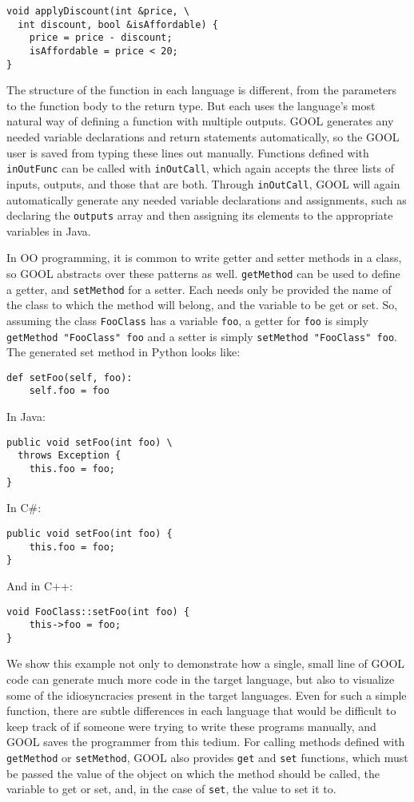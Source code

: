 \documentclass[sigplan,review,anonymous]{acmart}
\begin{document}
\begin{lstlisting}
void applyDiscount(int &price, \
  int discount, bool &isAffordable) {
    price = price - discount;
    isAffordable = price < 20;
}
\end{lstlisting}
The structure of the function in each language is different, from the 
parameters to the function body to the return type. But each uses the 
language's most natural way of defining a function with multiple outputs. GOOL 
generates any needed variable declarations and return statements automatically, 
so the GOOL user is saved from typing these lines out manually. Functions 
defined with \verb|inOutFunc| can be called with \verb|inOutCall|, which again 
accepts the three lists of inputs, outputs, and those that are both. Through 
\verb|inOutCall|, GOOL will again automatically generate any needed variable 
declarations and assignments, such as declaring the \verb|outputs| array and 
then assigning its elements to the appropriate variables in Java.

In OO programming, it is common to write getter and setter methods in a class, 
so GOOL abstracts over these patterns as well. \verb|getMethod| can be used to 
define a getter, and \verb|setMethod| for a setter. Each needs only be provided 
the name of the class to which the method will belong, and the variable to be 
get or set. So, assuming the class \verb|FooClass| has a variable \verb|foo|, a 
getter for \verb|foo| is simply \verb|getMethod "FooClass" foo| and a setter is 
simply \verb|setMethod "FooClass" foo|. The generated set method in Python 
looks like:
\begin{lstlisting}
def setFoo(self, foo):
    self.foo = foo
\end{lstlisting}
In Java:
\begin{lstlisting}
public void setFoo(int foo) \
  throws Exception {
    this.foo = foo;
}
\end{lstlisting}
In C\#:
\begin{lstlisting}
public void setFoo(int foo) {
    this.foo = foo;
}
\end{lstlisting}
And in C++:
\begin{lstlisting}
void FooClass::setFoo(int foo) {
    this->foo = foo;
}
\end{lstlisting}
We show this example not only to demonstrate how a single, small line of GOOL 
code can generate much more code in the target language, but also to visualize 
some of the idiosyncracies present in the target languages. Even for such a 
simple function, there are subtle differences in each language that would be 
difficult to keep track of if someone were trying to write these programs 
manually, and GOOL saves the programmer from this tedium. For calling methods 
defined with \verb|getMethod| or \verb|setMethod|, GOOL also provides 
\verb|get| and \verb|set| functions, which must be passed the value of the 
object on which the method should be called, the variable to get or set, and, 
in the case of \verb|set|, the value to set it to.
\end{document}
